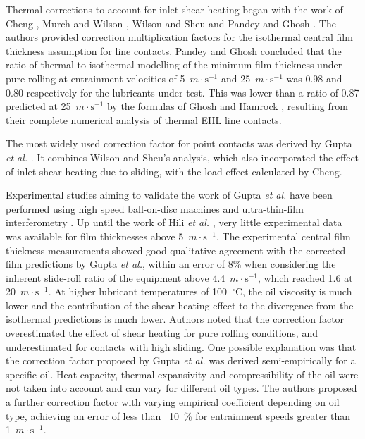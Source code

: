 Thermal corrections to account for inlet shear heating began with the work of Cheng \cite{Cheng1965a} \cite{Cheng1965b}, Murch and Wilson \cite{Murch1975}, Wilson and Sheu \cite{Wilson1983} and Pandey and Ghosh \cite{Pandey1996}. The authors provided correction multiplication factors for the isothermal central film thickness assumption for line contacts. Pandey and Ghosh concluded that the ratio of thermal to isothermal modelling of the minimum film thickness under pure rolling at entrainment velocities of 5~$m\cdot\mathrm{s}^{-1}$ and 25~$m\cdot\mathrm{s}^{-1}$ was 0.98 and 0.80 respectively for the lubricants under test. This was lower than a ratio of 0.87 predicted at 25~$m\cdot\mathrm{s}^{-1}$ by the formulas of Ghosh and Hamrock \cite{Ghosh1985}, resulting from their complete numerical analysis of thermal EHL line contacts.

The most widely used correction factor for point contacts was derived by Gupta \textit{et al.} \cite{Gupta1992}. It combines Wilson and Sheu’s analysis, which also incorporated the effect of inlet shear heating due to sliding, with the load effect calculated by Cheng.

Experimental studies aiming to validate the work of Gupta \textit{et al.} have been performed using high speed ball-on-disc machines and ultra-thin-film interferometry \cite{Johnston1991}. Up until the work of Hili \textit{et al.} \cite{Hili2010}, very little experimental data was available for film thicknesses above 5~$m\cdot\mathrm{s}^{-1}$. The experimental central film thickness measurements showed good qualitative agreement with the corrected film predictions by Gupta \textit{et al.}, within an error of 8\% when considering the inherent slide-roll ratio of the equipment above 4.4~$m\cdot\mathrm{s}^{-1}$, which reached 1.6 at 20~$m\cdot\mathrm{s}^{-1}$. At higher lubricant temperatures of 100~${ }^{\circ}\mathrm{C}$, the oil viscosity is much lower and the contribution of the shear heating effect to the divergence from the isothermal predictions is much lower. Authors noted that the correction factor overestimated the effect of shear heating for pure rolling conditions, and underestimated for contacts with high sliding. One possible explanation was that the correction factor proposed by Gupta \textit{et al.} was derived semi-empirically for a specific oil. Heat capacity, thermal expansivity and compressibility of the oil were not taken into account and can vary for different oil types. The authors proposed a further correction factor with varying empirical coefficient depending on oil type, achieving an error of less than ~10~\% for entrainment speeds greater than 1~$m\cdot\mathrm{s}^{-1}$.

